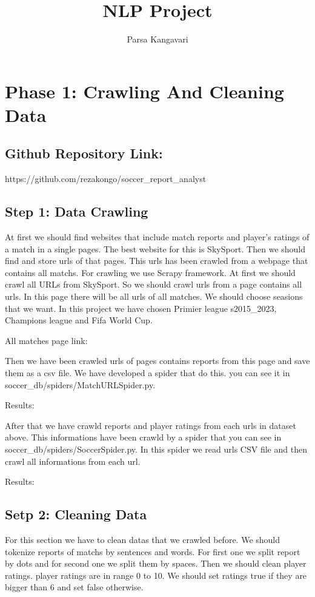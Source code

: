 \documentclass{article}
\title{NLP Project}
\author{Parsa Kangavari}
\begin{document}
 
\maketitle

\section{Phase 1: Crawling And Cleaning Data}

\subsection{Github Repository Link: }
https://github.com/rezakongo/soccer_report_analyst

\subsection{Step 1: Data Crawling}
At first we should find websites that include match reports and player's ratings of a match in a single pages. The best website for this is SkySport.
Then we should find and store urls of that pages. This urls has been crawled from a webpage that contains all matchs. For crawling we use Scrapy framework.
At first we should crawl all URLs from SkySport. So we should crawl urls from a page contains all urls. In this page there will be all urls of all matches.
We should choose seasions that we want. In this project we have chosen Primier league s2015_2023, Champions league and Fifa World Cup.

All matches page link:


Then we have been crawled urls of pages contains reports from this page and save them as a csv file. We have developed a spider that do this. you can see it in soccer_db/spiders/MatchURLSpider.py.

Results:


After that we have crawld reports and player ratings from each urls in dataset above. This informations have been crawld by a spider that you can see in soccer_db/spiders/SoccerSpider.py.
In this spider we read urls CSV file and then crawl all informations from each url.

Results: 

\subsection{Setp 2: Cleaning Data}
For this section we have to clean datas that we crawled before. We should tokenize reports of matchs by sentences and words. 
For first one we split report by dots and for second one we split them by spaces. Then we should clean player ratings. player ratings are in range 0 to 10.
We should set ratings true if they are bigger than 6 and set false otherwise.
\end{document}

